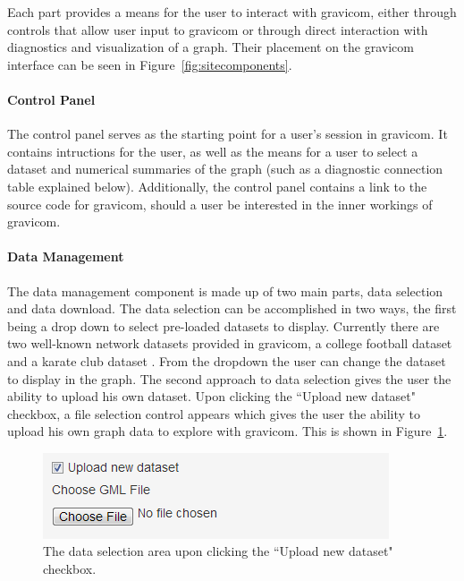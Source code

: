 \documentclass{article}\usepackage[]{graphicx}\usepackage[]{color}
\begin{document}
Each part provides a means for the user to interact with gravicom, either through controls that allow user input to gravicom or through direct interaction with diagnostics and visualization of a graph. Their placement on the gravicom interface can be seen in Figure~\ref{fig:sitecomponents}.

\paragraph{Control Panel}
The control panel serves as the starting point for a user's session in gravicom. It contains intructions for the user, as well as the means for a user to select a dataset and numerical summaries of the graph (such as a diagnostic connection table explained below). Additionally, the control panel contains a link to the source code for gravicom, should a user be interested in the inner workings of gravicom.

\paragraph{Data Management}
The data management component is made up of two main parts, data selection and data download. The data selection can be accomplished in two ways, the first being a drop down to select pre-loaded datasets to display. Currently there are two well-known network datasets provided in gravicom, a college football dataset \cite{gn-football} and a karate club dataset \cite{zachary1977information}. From the dropdown the user can change the dataset to display in the graph. The second approach to data selection gives the user the ability to upload his own dataset. Upon clicking the ``Upload new dataset" checkbox, a file selection control appears which gives the user the ability to upload his own graph data to explore with gravicom. This is shown in Figure~\ref{fig:uploadnewdataset}. 

\begin{figure}[H]
\centering
\includegraphics[]{images/uploadnewdataset.png}
\caption{\label{fig:uploadnewdataset} The data selection area upon clicking the ``Upload new dataset" checkbox.}
\end{figure}
\end{document}
